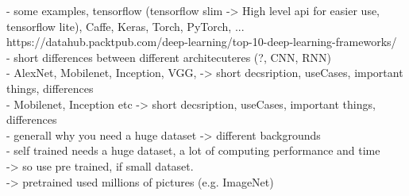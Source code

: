 		- some examples, tensorflow (tensorflow slim -> High  level api for easier use, tensorflow lite), Caffe, Keras, Torch, PyTorch, ... \\
		https://datahub.packtpub.com/deep-learning/top-10-deep-learning-frameworks/ \\
		- short differences between different architecuteres (?, CNN, RNN) \\
 		- AlexNet, Mobilenet, Inception, VGG, -> short decsription, useCases, important things, differences \\
 		- Mobilenet, Inception etc -> short decsription, useCases, important things, differences \\
		- generall why you need a huge dataset -> different backgrounds \\
		- self trained needs a huge dataset, a lot of computing performance and time \\
		-> so use pre trained, if small dataset. \\
		-> pretrained used millions of pictures (e.g. ImageNet)